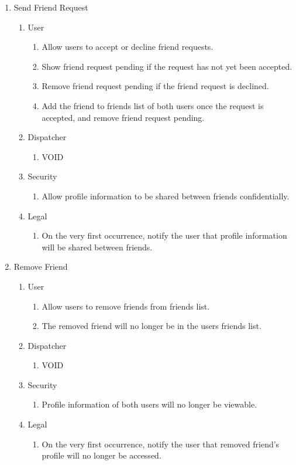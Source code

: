 \documentclass[english]{article}
\begin{document}
\begin{enumerate}[{BE}1.]
	\item Send Friend Request
	\begin{enumerate}[{VP8}.1]
		\item User
			\begin{enumerate}
				\item Allow users to accept or decline friend requests.
				\item Show friend request pending if the request has not yet been accepted.
				\item Remove friend request pending if the friend request is declined.
				\item Add the friend to friends list of both users once the request is accepted, and remove friend request pending.
			\end{enumerate}
		\item Dispatcher
			\begin{enumerate}
				\item VOID
			\end{enumerate}
		\item Security
			\begin{enumerate}
				\item Allow profile information to be shared between friends confidentially.
			\end{enumerate}
		\item Legal
			\begin{enumerate}
				\item On the very first occurrence, notify the user that profile information will be shared between friends.
			\end{enumerate}
	\end{enumerate}
	
	\item Remove Friend
	\begin{enumerate}[{VP9}.1]
		\item User
			\begin{enumerate}
				\item Allow users to remove friends from friends list.
				\item The removed friend will no longer be in the users friends list.
			\end{enumerate}
		\item Dispatcher
			\begin{enumerate}
				\item VOID
			\end{enumerate}
		\item Security
			\begin{enumerate}
				\item Profile information of both users will no longer be viewable.
			\end{enumerate}
		\item Legal
			\begin{enumerate}
				\item On the very first occurrence, notify the user that removed friend's profile will no longer be accessed.
			\end{enumerate}
	\end{enumerate}
	

\end{enumerate}
\end{document}
